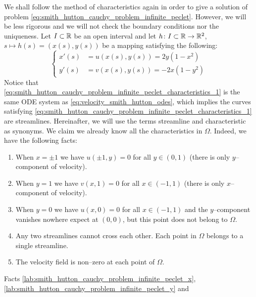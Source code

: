 We shall follow the method of characteristics again in
order to give a solution of problem
\eqref{eq:smith_hutton_cauchy_problem_infinite_peclet}. However, we will be less
rigorous and we will not check the boundary conditions nor the uniqueness. Let
$I \subset \mathbb{R}$ be an open interval and let $h \colon I \subset \mathbb{R} \to
\mathbb{R}^2$, $s \mapsto h(s) = (x(s), y(s))$ be a mapping satisfying the following:
\begin{equation} \label{eq:smith_hutton_cauchy_problem_infinite_peclet_characteristics_1} 
	\left\{
	\begin{aligned}
		x'(s) &= u(x(s), y(s)) = 2 y (1 - x^2) \\
		y'(s) &= v(x(s), y(s)) = - 2 x (1 - y^2)
	\end{aligned}
	\right.
\end{equation}
Notice that
\eqref{eq:smith_hutton_cauchy_problem_infinite_peclet_characteristics_1} is the
same ODE system as \eqref{eq:velocity_smith_hutton_odes}, which implies the
curves satisfying
\eqref{eq:smith_hutton_cauchy_problem_infinite_peclet_characteristics_1} are
streamlines. Hereinafter, we will use the terms streamline and characteristic as
synonyms. We claim we already know all the characteristics in $\Omega$. Indeed,
we have the following facts:
\begin{enumerate}[label={(\roman*)}, topsep=0pt]
\label{lab:smith_hutton_cauchy_problem_infinite_peclet_i}
	\item When $x = \pm 1$ we have $u(\pm 1, y) = 0$ for all $y \in (0, 1)$
	(there is only $y$--component of velocity).
	\label{lab:smith_hutton_cauchy_problem_infinite_peclet_x}
	\item When $y = 1$ we have $v(x, 1) = 0$ for all $x \in (-1,1)$ (there is
	only $x$--component of velocity).
	\label{lab:smith_hutton_cauchy_problem_infinite_peclet_y}
	\item When $y = 0$ we have $u(x,0) = 0$ for all $x \in (-1,1)$ and the
	$y$--component vanishes nowhere expect at $(0,0)$, but this point does not
	belong to $\Omega$.
	\label{lab:smith_hutton_cauchy_problem_infinite_peclet_iv}
	\item Any two streamlines cannot cross each other. Each point in $\Omega$
	belongs to a single streamline.
	\label{lab:smith_hutton_cauchy_problem_infinite_peclet_v}
	\item The velocity field is non--zero at each point of $\Omega$.
\end{enumerate}
Facts \ref{lab:smith_hutton_cauchy_problem_infinite_peclet_x},
\ref{lab:smith_hutton_cauchy_problem_infinite_peclet_y} and

